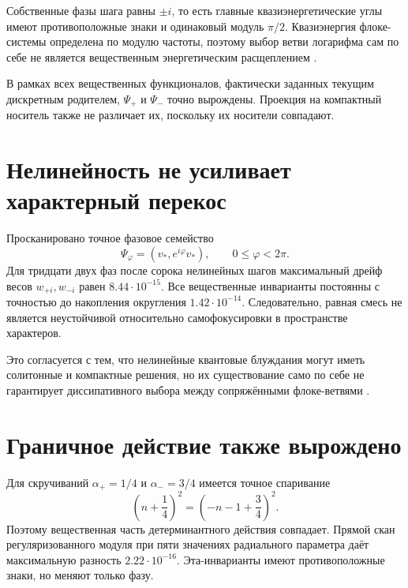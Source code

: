 Собственные фазы шага равны $\pm i$, то есть главные квазиэнергетические
углы имеют противоположные знаки и одинаковый модуль $\pi/2$.
Квазиэнергия флоке-системы определена по модулю частоты, поэтому выбор
ветви логарифма сам по себе не является вещественным энергетическим
расщеплением \cite{energy-degeneracy-floquet-review}.

\begin{proposition}
В рамках всех вещественных функционалов, фактически заданных текущим
дискретным родителем, $\Psi_+$ и $\Psi_-$ точно вырождены. Проекция на
компактный носитель также не различает их, поскольку их носители
совпадают.
\end{proposition}

\section{Нелинейность не усиливает характерный перекос}

Просканировано точное фазовое семейство
\begin{equation}
 \Psi_\varphi=(v_*,e^{i\varphi}v_*),
 \qquad 0\leq\varphi<2\pi.
\end{equation}
Для тридцати двух фаз после сорока нелинейных шагов максимальный дрейф
весов $w_{+i},w_{-i}$ равен $8.44\cdot10^{-15}$. Все вещественные
инварианты постоянны с точностью до накопления округления
$1.42\cdot10^{-14}$. Следовательно, равная смесь не является
неустойчивой относительно самофокусировки в пространстве характеров.

Это согласуется с тем, что нелинейные квантовые блуждания могут иметь
солитонные и компактные решения, но их существование само по себе не
гарантирует диссипативного выбора между сопряжёнными флоке-ветвями
\cite{energy-degeneracy-nonlinear-walk}.

\section{Граничное действие также вырождено}

Для скручиваний $\alpha_+=1/4$ и $\alpha_-=3/4$ имеется точное спаривание
\begin{equation}
 \left(n+\frac14\right)^2
 =\left(-n-1+\frac34\right)^2.
 \label{eq:v6-compacton-boundary-spectrum-pairing}
\end{equation}
Поэтому вещественная часть детерминантного действия совпадает. Прямой
скан регуляризованного модуля при пяти значениях радиального параметра
даёт максимальную разность $2.22\cdot10^{-16}$. Эта-инварианты имеют
противоположные знаки, но меняют только фазу.


